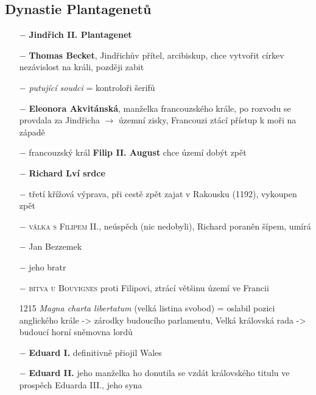 \documentclass{article}
\begin{document}
\subsection*{Dynastie Plantagenetů}
\begin{itemize}
    \vspace{-0.5em}
    \setlength\itemsep{0.15em}
    \item[$-$] \textbf{Jindřich II. Plantagenet}
    \item[$-$] \textbf{Thomas Becket}, Jindřichův přítel, arcibiskup, chce vytvořit církev nezávislost na králi, později zabit
    \item[$-$] \textit{putující soudci} = kontroloři šerifů
    \item[$-$] \textbf{Eleonora Akvitánská}, manželka francouzského krále, po rozvodu se provdala za Jindřicha $\rightarrow$ územní zisky, Francouzi ztácí přístup k moři na západě
    \item[$-$] francouzský král \textbf{Filip II. August} chce území dobýt zpět

    \item[$-$] \textbf{Richard Lví srdce}
    \item[$-$] třetí křížová výprava, při cestě zpět zajat v Rakousku (1192), vykoupen zpět
    \item[$-$] \textsc{válka s Filipem II.}, neúspěch (nic nedobyli), Richard poraněn šípem, umírá
    \item[$-$] Jan Bezzemek
    \item[$-$] jeho bratr
    \item[$-$] \textsc{bitva u Bouvignes} proti Filipovi, ztrácí většinu území ve Francii
    \item[1215] \textit{Magna charta libertatum} (velká listina svobod) = oslabil pozici anglického krále -> zárodky budoucího parlamentu, Velká královská rada -> budoucí horní sněmovna lordů
    \item[$-$] \textbf{Eduard I.} definitivně přiojil Wales
    \item[$-$] \textbf{Eduard II.} jeho manželka ho donutila se vzdát královského titulu ve prospěch Eduarda III., jeho syna
\end{itemize}
\end{document}
